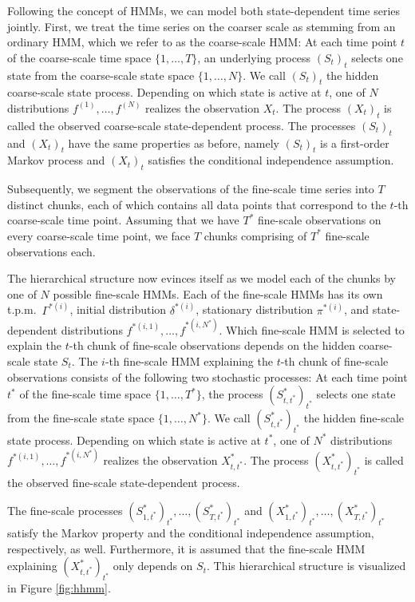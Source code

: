 \documentclass[article]{jss}
\begin{document}
Following the concept of HMMs, we can model both state-dependent time series jointly. First, we treat the time series on the coarser scale as stemming from an ordinary HMM, which we refer to as the coarse-scale HMM: At each time point $t$ of the coarse-scale time space $\{1,\dots,T\}$, an underlying process $(S_t)_t$ selects one state from the coarse-scale state space $\{1,\dots,N\}$. We call $(S_t)_t$ the hidden coarse-scale state process. Depending on which state is active at $t$, one of $N$ distributions $f^{(1)},\dots,f^{(N)}$ realizes the observation $X_t$. The process $(X_t)_t$ is called the observed coarse-scale state-dependent process. The processes $(S_t)_t$ and $(X_t)_t$ have the same properties as before, namely $(S_t)_t$ is a first-order Markov process and $(X_t)_t$ satisfies the conditional independence assumption. 

Subsequently, we segment the observations of the fine-scale time series into $T$ distinct chunks, each of which contains all data points that correspond to the $t$-th coarse-scale time point. Assuming that we have $T^*$ fine-scale observations on every coarse-scale time point, we face $T$ chunks comprising of $T^*$ fine-scale observations each. 

The hierarchical structure now evinces itself as we model each of the chunks by one of $N$ possible fine-scale HMMs. Each of the fine-scale HMMs has its own t.p.m.\ $\Gamma^{*(i)}$, initial distribution $\delta^{*(i)}$, stationary distribution $\pi^{*(i)}$, and state-dependent distributions $f^{*(i,1)},\dots,f^{*(i,N^*)}$. Which fine-scale HMM is selected to explain the $t$-th chunk of fine-scale observations depends on the hidden coarse-scale state $S_t$. The $i$-th fine-scale HMM explaining the $t$-th chunk of fine-scale observations consists of the following two stochastic processes: At each time point $t^*$ of the fine-scale time space $\{1,\dots,T^*\}$, the process $(S^*_{t,t^*})_{t^*}$ selects one state from the fine-scale state space $\{1,\dots,N^*\}$. We call $(S^*_{t,t^*})_{t^*}$ the hidden fine-scale state process. Depending on which state is active at $t^*$, one of $N^*$ distributions $f^{*(i,1)},\dots,f^{*(i,N^*)}$ realizes the observation $X^*_{t,t^*}$. The process $(X^*_{t,t^*})_{t^*}$ is called the observed fine-scale state-dependent process. 

The fine-scale processes $(S^*_{1,t^*})_{t^*},\dots,(S^*_{T,t^*})_{t^*}$ and $(X^*_{1,t^*})_{t^*},\dots,(X^*_{T,t^*})_{t^*}$ satisfy the Markov property and the conditional independence assumption, respectively, as well. Furthermore, it is assumed that the fine-scale HMM explaining $(X^*_{t,t^*})_{t^*}$ only depends on $S_t$. This hierarchical structure is visualized in Figure \ref{fig:hhmm}.
\end{document}
